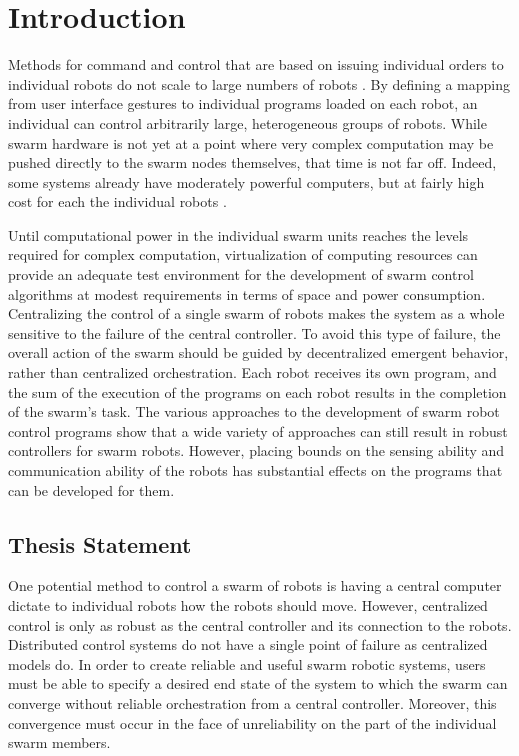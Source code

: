 \chapter{Introduction}
\thispagestyle{fancy}

Methods for command and control that are based on issuing individual orders to individual robots do not scale to large numbers of robots \citep{WangSearchScale}.
By defining a mapping from user interface gestures to individual programs loaded on each robot, an individual can control arbitrarily large, heterogeneous groups of robots.
While swarm hardware is not yet at a point where very complex computation may be pushed directly to the swarm nodes themselves, that time is not far off. 
Indeed, some systems already have moderately powerful computers, but at fairly high cost for each the individual robots \citep{millard2017pi}.

Until computational power in the individual swarm units reaches the levels required for complex computation, virtualization of computing resources can provide an adequate test environment for the development of swarm control algorithms at modest requirements in terms of space and power consumption. 
Centralizing the control of a single swarm of robots makes the system as a whole sensitive to the failure of the central controller. 
To avoid this type of failure, the overall action of the swarm should be guided by decentralized emergent behavior, rather than centralized orchestration. 
Each robot receives its own program, and the sum of the execution of the programs on each robot results in the completion of the swarm's task.
The various approaches to the development of swarm robot control programs show that a wide variety of approaches can still result in robust controllers for swarm robots. 
However, placing bounds on the sensing ability and communication ability of the robots has substantial effects on the programs that can be developed for them. 

\section{Thesis Statement} \label{section:Problem_Statement}

One potential method to control a swarm of robots is having a central computer dictate to individual robots how the robots should move.
However, centralized control is only as robust as the central controller and its connection to the robots. 
Distributed control systems do not have a single point of failure as centralized models do. 
In order to create reliable and useful swarm robotic systems, users must be able to specify a desired end state of the system to which the swarm can converge without reliable orchestration from a central controller. 
Moreover, this convergence must occur in the face of unreliability on the part of the individual swarm members. 


